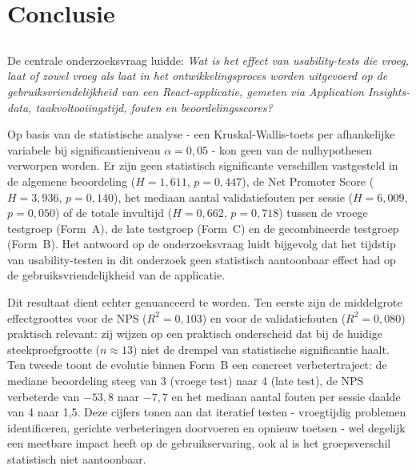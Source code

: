 
\chapter{Conclusie}%
\label{ch:conclusie}

\section{}

De centrale onderzoeksvraag luidde: \textit{Wat is het effect van usability-tests die vroeg, laat of zowel vroeg als laat in het ontwikkelingsproces worden uitgevoerd op de gebruiksvriendelijkheid van een React-applicatie, gemeten via Application Insights-data, taakvoltooiingstijd, fouten en beoordelingsscores?}

Op basis van de statistische analyse - een Kruskal-Wallis-toets per afhankelijke variabele bij significantieniveau $\alpha = 0{,}05$ - kon geen van de nulhypothesen verworpen worden. Er zijn geen statistisch significante verschillen vastgesteld in de algemene beoordeling ($H = 1{,}611$, $p = 0{,}447$), de Net Promoter Score ($H = 3{,}936$, $p = 0{,}140$), het mediaan aantal validatiefouten per sessie ($H = 6{,}009$, $p = 0{,}050$) of de totale invultijd ($H = 0{,}662$, $p = 0{,}718$) tussen de vroege testgroep (Form~A), de late testgroep (Form~C) en de gecombineerde testgroep (Form~B). Het antwoord op de onderzoeksvraag luidt bijgevolg dat het tijdstip van usability-testen in dit onderzoek geen statistisch aantoonbaar effect had op de gebruiksvriendelijkheid van de applicatie.

Dit resultaat dient echter genuanceerd te worden. Ten eerste zijn de middelgrote effectgroottes voor de NPS ($R^2 = 0{,}103$) en voor de validatiefouten ($R^2 = 0{,}080$) praktisch relevant: zij wijzen op een praktisch onderscheid dat bij de huidige steekproefgrootte ($n \approx 13$) niet de drempel van statistische significantie haalt. Ten tweede toont de evolutie binnen Form~B een concreet verbetertraject: de mediane beoordeling steeg van 3 (vroege test) naar 4 (late test), de NPS verbeterde van $-53{,}8$ naar $-7{,}7$ en het mediaan aantal fouten per sessie daalde van 4 naar 1{,}5. Deze cijfers tonen aan dat iteratief testen - vroegtijdig problemen identificeren, gerichte verbeteringen doorvoeren en opnieuw toetsen - wel degelijk een meetbare impact heeft op de gebruikservaring, ook al is het groepsverschil statistisch niet aantoonbaar.

